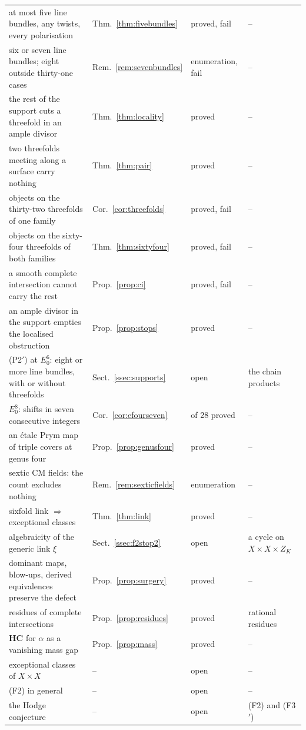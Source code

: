 \documentclass[11pt,reqno]{amsart}
\numberwithin{equation}{section}
\theoremstyle{plain}
\theoremstyle{definition}
\newcommand{\HC}{\mathbf{HC}}
\newcommand{\Fii}{\texorpdfstring{\textup{(F2)}}{(F2)}}
\newcommand{\Fiii}{\texorpdfstring{\textup{(F3$'$)}}{(F3')}}
\begin{document}
\begin{longtable}{@{}>{\raggedright\arraybackslash}p{}>{\raggedright\arraybackslash}p{}>{\raggedright\arraybackslash}p{}>{\raggedright\arraybackslash}p{}@{}}
at most five line bundles, any twists, every polarisation & Thm.~\ref{thm:fivebundles} & proved, fail & -- \\
six or seven line bundles; eight outside thirty-one cases & Rem.~\ref{rem:sevenbundles} & enumeration, fail & -- \\
the rest of the support cuts a threefold in an ample divisor & Thm.~\ref{thm:locality} & proved & -- \\
two threefolds meeting along a surface carry nothing & Thm.~\ref{thm:pair} & proved & -- \\
objects on the thirty-two threefolds of one family & Cor.~\ref{cor:threefolds} & proved, fail & -- \\
objects on the sixty-four threefolds of both families & Thm.~\ref{thm:sixtyfour} & proved, fail & -- \\
a smooth complete intersection cannot carry the rest & Prop.~\ref{prop:ci} & proved, fail & -- \\
an ample divisor in the support empties the localised obstruction & Prop.~\ref{prop:stops} & proved & -- \\
(P2$'$) at $E_{0}^{6}$: eight or more line bundles, with or without threefolds & Sect.~\ref{ssec:supports} & open & the chain products \\
$E_{0}^{8}$: shifts in seven consecutive integers & Cor.~\ref{cor:efourseven} & 18 of 28 proved & -- \\
an \'etale Prym map of triple covers at genus four & Prop.~\ref{prop:genusfour} & proved & -- \\
sextic CM fields: the count excludes nothing & Rem.~\ref{rem:sexticfields} & enumeration & -- \\
sixfold link $\Rightarrow$ exceptional classes & Thm.~\ref{thm:link} & proved & -- \\
algebraicity of the generic link $\xi$ & Sect.~\ref{ssec:f2stop2} & open & a cycle on $X\times X\times Z_{K}$ \\
dominant maps, blow-ups, derived equivalences preserve the defect & Prop.~\ref{prop:surgery} & proved & -- \\
residues of complete intersections & Prop.~\ref{prop:residues} & proved & rational residues \\
$\HC$ for $\alpha$ as a vanishing mass gap & Prop.~\ref{prop:mass} & proved & -- \\
exceptional classes of $X\times X$ & -- & open & -- \\
\Fii{} in general & -- & open & -- \\
the Hodge conjecture & -- & open & \Fii{} and \Fiii{} \\


\end{longtable}
\end{document}
